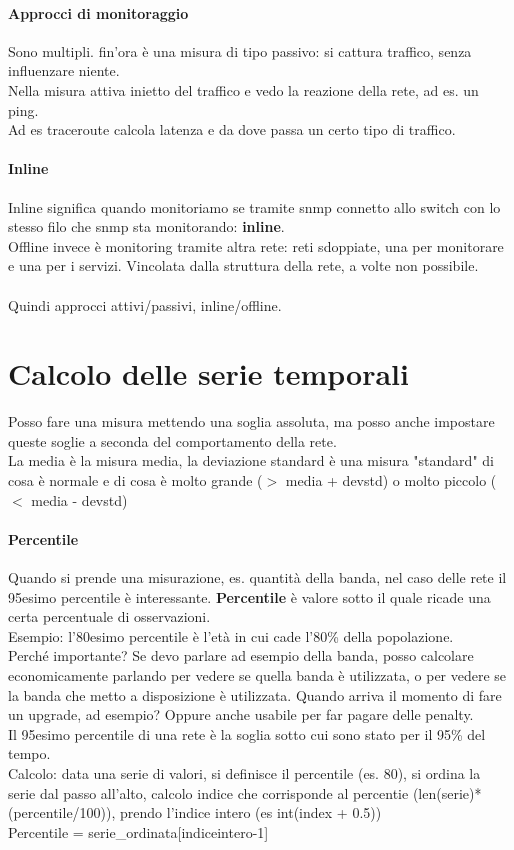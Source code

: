 \documentclass[10pt]{book}
\begin{document}
\paragraph{Approcci di monitoraggio} Sono multipli. fin'ora è una misura di tipo passivo: si cattura traffico, senza influenzare niente.\\
Nella misura attiva inietto del traffico e vedo la reazione della rete, ad es. un ping.\\
Ad es traceroute calcola latenza e da dove passa un certo tipo di traffico.\\
\paragraph{Inline} Inline significa quando monitoriamo se tramite snmp connetto allo switch con lo stesso filo che snmp sta monitorando: \textbf{inline}.\\
Offline invece è monitoring tramite altra rete: reti sdoppiate, una per monitorare e una per i servizi. Vincolata dalla struttura della rete, a volte non possibile.\\\\
Quindi approcci attivi/passivi, inline/offline.
\section{Calcolo delle serie temporali}
Posso fare una misura mettendo una soglia assoluta, ma posso anche impostare queste soglie a seconda del comportamento della rete.\\
La media è la misura media, la deviazione standard è una misura "standard" di cosa è normale e di cosa è molto grande ($>$ media + devstd) o molto piccolo ($<$ media - devstd)
\paragraph{Percentile} Quando si prende una misurazione, es. quantità della banda, nel caso delle rete il 95esimo percentile è interessante. \textbf{Percentile} è valore sotto il quale ricade una certa percentuale di osservazioni.\\
Esempio: l'80esimo percentile è l'età in cui cade l'80\% della popolazione.\\
Perché importante? Se devo parlare ad esempio della banda, posso calcolare economicamente parlando per vedere se quella banda è utilizzata, o per vedere se la banda che metto a disposizione è utilizzata. Quando arriva il momento di fare un upgrade, ad esempio? Oppure anche usabile per far pagare delle penalty.\\
Il 95esimo percentile di una rete è la soglia sotto cui sono stato per il 95\% del tempo.\\
Calcolo: data una serie di valori, si definisce il percentile (es. 80), si ordina la serie dal passo all'alto, calcolo indice che corrisponde al percentie (len(serie)*(percentile/100)), prendo l'indice intero (es int(index + 0.5))\\
Percentile = serie\_ordinata[indiceintero-1]
\end{document}
